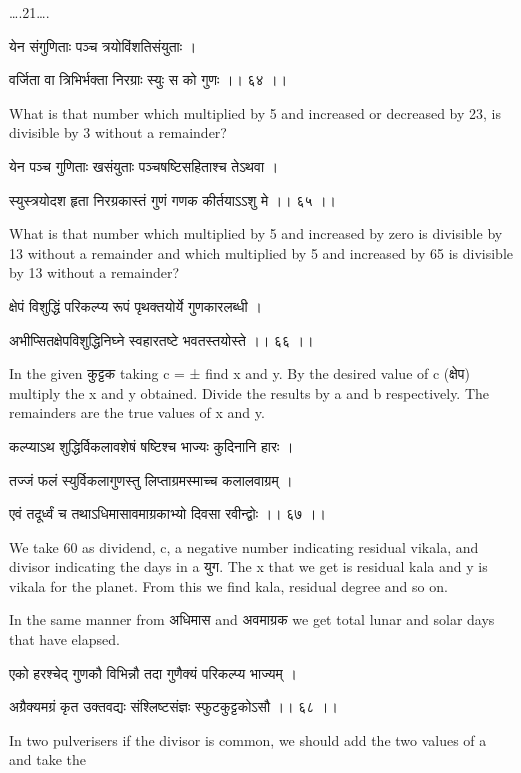 \documentclass[]{article}
\date{}
\begin{document}
{\ldots{}.21\ldots{}.}

{येन संगुणिताः पञ्च त्रयोविंशतिसंयुताः । }

{वर्जिता वा त्रिभिर्भक्ता निरग्राः स्युः स को गुणः ।। ६४ ।। }

{What is that number which multiplied by 5 and increased or decreased by
23, is divisible by 3 without a remainder?}

{येन पञ्च गुणिताः खसंयुताः पञ्चषष्टिसहिताश्च तेऽथवा । }

{स्युस्त्रयोदश हृता निरग्रकास्तं गुणं गणक कीर्तयाऽऽशु मे ।। ६५ ।। }

{What is that number which multiplied by 5 and increased by zero is
divisible by 13 without a remainder and which multiplied by 5 and
increased by 65 is divisible by 13 without a remainder?}

{क्षेपं विशुद्धिं परिकल्प्य रूपं पृथक्तयोर्ये गुणकारलब्धी । }

{अभीप्सितक्षेपविशुद्धिनिघ्ने स्वहारतष्टे भवतस्तयोस्ते ।। ६६ ।। }

{In the given कुट्टक taking c = ± find x and y. By the desired value of
c (क्षेप) multiply the x and y obtained. Divide the results by a and b
respectively. The remainders are the true values of x and y.}

{कल्प्याऽथ शुद्धिर्विकलावशेषं षष्टिश्च भाज्यः कुदिनानि हारः । }

{तज्जं फलं स्युर्विकलागुणस्तु लिप्ताग्रमस्माच्च कलालवाग्रम् । }

{एवं तदूर्ध्वं च तथाऽधिमासावमाग्रकाभ्यो दिवसा रवीन्द्वोः ।। ६७ ।। }

{We take 60 as dividend, c, a negative number indicating residual
vikala, and divisor indicating the days in a युग. The x that we get is
residual kala and y is vikala for the planet. From this we find kala,
residual degree and so on.}

{In the same manner from अधिमास and अवमाग्रक we get total lunar and
solar days that have elapsed.}

{एको हरश्चेद् गुणकौ विभिन्नौ तदा गुणैक्यं परिकल्प्य भाज्यम् । }

{अग्रैक्यमग्रं कृत उक्तवद्यः संश्लिष्टसंज्ञः स्फुटकुट्टकोऽसौ ।। ६८ ।। }

{In two pulverisers if the divisor is common, we should add the two
values of a and take the\\
}
\end{document}

